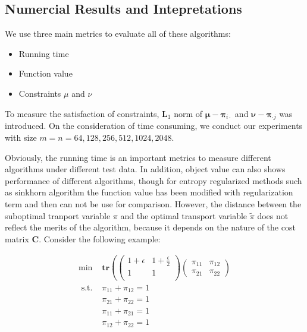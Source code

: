 \clearpage
\subsection{Numercial Results and Intepretations}

We use three main metrics to evaluate all of these algorithms:

\begin{itemize}
    \item Running time
    \item Function value
    \item Constraints $\mu$ and $\nu$ 
\end{itemize}

To measure the satisfaction of constraints, $\mathbf{L}_1$ norm of $\mathbf{\mu} - \mathbf{\pi}_{i\cdot}$ and $\mathbf{\nu} - \mathbf{\pi}_{\cdot j}$ was introduced. On the consideration of time consuming, we conduct our experiments with size $m = n = 64, 128, 256, 512, 1024, 2048$.

Obviously, the running time is an important metrics to measure different algorithms under different test data. In addition, object value can also shows performance of different algorithms, though for entropy regularized methods such as sinkhorn algorithm the function value has been modified with regularization term and then can not be use for comparison.
However, the distance between the suboptimal tranport variable $\pi$ and the optimal transport variable $\tilde \pi$ does not reflect the merits of the algorithm, because it depends on the nature of the cost matrix $\mathbf{C}$. Consider the following example:

\begin{equation}
    \begin{array}{cl}
        {\min } & {\mathbf{t} \mathbf{r}\left(\left(\begin{array}{cc}
        {1+\epsilon} & {1 + \frac{\epsilon}{2}}\\
        {1} & {1} \\
        \end{array}\right)\left(\begin{array}{cc}
        {\pi_{11}} & {\pi_{12}} \\
        {\pi_{21}} & {\pi_{22}}
        \end{array}\right)\right.} \\
        {\text { s.t. }} & {\pi_{11}+\pi_{12}=1} \\
        & {\pi_{21}+\pi_{22}=1} \\
        & {\pi_{11}+\pi_{21}=1} \\
        & {\pi_{12}+\pi_{22}=1}
    \end{array}
\end{equation}

